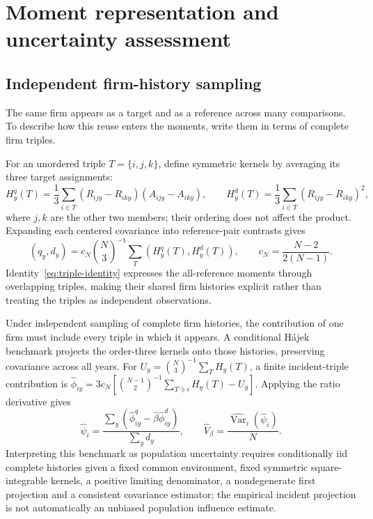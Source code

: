 \section{Moment representation and uncertainty
assessment}\label{app:annual-gmm}

\subsection{Independent firm-history sampling}\label{app:history-sampling}

The same firm appears as a target and as a reference across many comparisons.
To describe how this reuse enters the moments, write them in terms of complete
firm triples.

For an unordered triple $T=\{i,j,k\}$, define symmetric kernels by averaging
its three target assignments:
\begin{equation}\label{eq:complete-triples}
  H^q_y(T)=\frac13\sum_{i\in T}(R_{ijy}-R_{iky})(A_{ijy}-A_{iky}),\qquad
  H^d_y(T)=\frac13\sum_{i\in T}(R_{ijy}-R_{iky})^2,
\end{equation}
where $j,k$ are the other two members; their ordering does not affect
the product.
Expanding each centered covariance into reference-pair contrasts gives
\begin{equation}\label{eq:triple-identity}
  (q_y,d_y)=c_N\binom N3^{-1}\sum_T(H^q_y(T),H^d_y(T)),\qquad
  c_N=\frac{N-2}{2(N-1)}.
\end{equation}
Identity~\eqref{eq:triple-identity} expresses the all-reference moments through
overlapping triples, making their shared firm histories explicit rather than
treating the triples as independent observations.

Under independent sampling of complete firm histories, the contribution of
one firm must include every triple in which it appears.
A conditional H\'ajek benchmark projects the order-three kernels onto those
histories, preserving covariance across all years.
For $U_y=\binom N3^{-1}\sum_T H_y(T)$, a finite incident-triple contribution is
$\widehat\phi_{iy}=3c_N[\binom{N-1}{2}^{-1}\sum_{T\ni i}H_y(T)-U_y]$.
Applying the ratio derivative gives
\begin{equation}\label{eq:conditional-sandwich}
  \widehat\psi_i=
  \frac{\sum_y(\widehat\phi^q_{iy}-\widehat\beta\widehat\phi^d_{iy})}{\sum_y
  d_y},\qquad
  \widehat V_{\beta}=\frac{\widehat{\operatorname{Var}}_i(\widehat\psi_i)}{N}.
\end{equation}
Interpreting this benchmark as population uncertainty requires conditionally
iid complete histories given a fixed common environment, fixed symmetric
square-integrable kernels, a positive limiting denominator, a nondegenerate
first projection and a consistent covariance estimator; the empirical
incident projection is not automatically an unbiased population influence
estimate.


